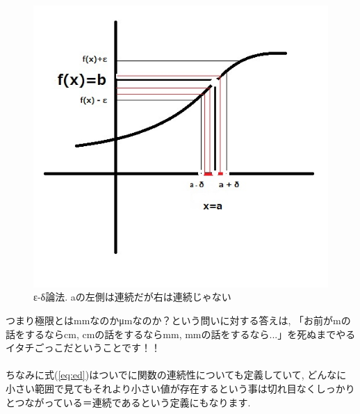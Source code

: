 \documentclass[11pt,a4paper]{jreport}
\begin{document}
\begin{figure}[H]
\label{im:ed}
  \centering
  \includegraphics[width=120mm,bb=0 0 510 487]{figures/ed.jpg}
  \caption{ε-δ論法. aの左側は連続だが右は連続じゃない}
\end{figure}

つまり極限とはmmなのかμmなのか？という問いに対する答えは, 「お前がmの話をするならcm, cmの話をするならmm, mmの話をするなら...」を死ぬまでやるイタチごっこだということです！！\\
\\
ちなみに式(\ref{eq:ed})はついでに関数の連続性についても定義していて, どんなに小さい範囲で見てもそれより小さい値が存在するという事は切れ目なくしっかりとつながっている＝連続であるという定義にもなります.\\
\end{document}
